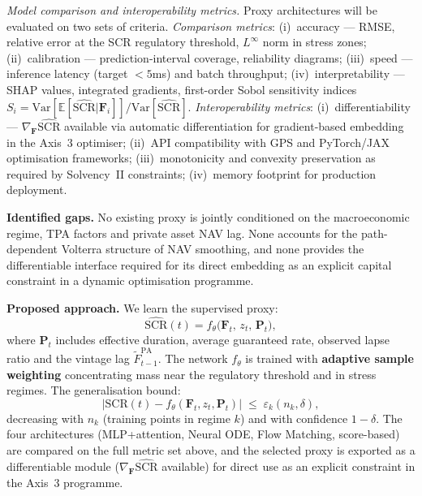 \documentclass[11pt,a4paper]{article}
\begin{document}
\textit{Model comparison and interoperability metrics.}
Proxy architectures will be evaluated on two sets of criteria.
\textit{Comparison metrics}: (i)~accuracy --- RMSE, relative error at the SCR
regulatory threshold, $L^\infty$ norm in stress zones; (ii)~calibration ---
prediction-interval coverage, reliability diagrams; (iii)~speed --- inference
latency (target $<5$ms) and batch throughput; (iv)~interpretability ---
SHAP values, integrated gradients, first-order Sobol sensitivity indices
$S_i = \mathrm{Var}[\mathbb{E}[\widehat{\mathrm{SCR}}|\mathbf{F}_i]]/
\mathrm{Var}[\widehat{\mathrm{SCR}}]$.
\textit{Interoperability metrics}: (i)~differentiability ---
$\nabla_\mathbf{F}\widehat{\mathrm{SCR}}$ available via automatic
differentiation for gradient-based embedding in the Axis~3 optimiser;
(ii)~API compatibility with GPS and PyTorch/JAX optimisation frameworks;
(iii)~monotonicity and convexity preservation as required by Solvency~II
constraints; (iv)~memory footprint for production deployment.

\noindent\textbf{Identified gaps.}
No existing proxy is jointly conditioned on the macroeconomic regime, TPA
factors and private asset NAV lag. None accounts for the path-dependent
Volterra structure of NAV smoothing, and none provides the differentiable
interface required for its direct embedding as an explicit capital constraint
in a dynamic optimisation programme.

\noindent\textbf{Proposed approach.}
We learn the supervised proxy:
\begin{equation}
  \widehat{\mathrm{SCR}}(t)
  = f_\theta\!\bigl(\mathbf{F}_t,\,z_t,\,\mathbf{P}_t\bigr),
\label{eq:proxy}
\end{equation}
where $\mathbf{P}_t$ includes effective duration, average guaranteed rate,
observed lapse ratio and the vintage lag $\tilde{F}^{\mathrm{PA}}_{t-1}$.
The network $f_\theta$ is trained with \textbf{adaptive sample weighting}
concentrating mass near the regulatory threshold and in stress regimes.
The generalisation bound:
\begin{equation}
  \bigl|\mathrm{SCR}(t) - f_\theta(\mathbf{F}_t,z_t,\mathbf{P}_t)\bigr|
  \;\le\; \varepsilon_k(n_k,\delta),
\label{eq:bound}
\end{equation}
decreasing with $n_k$ (training points in regime $k$) and with confidence
$1-\delta$. The four architectures (MLP+attention, Neural ODE, Flow Matching,
score-based) are compared on the full metric set above, and the selected proxy
is exported as a differentiable module ($\nabla_\mathbf{F}\widehat{\mathrm{SCR}}$
available) for direct use as an explicit constraint in the Axis~3 programme.
\end{document}
